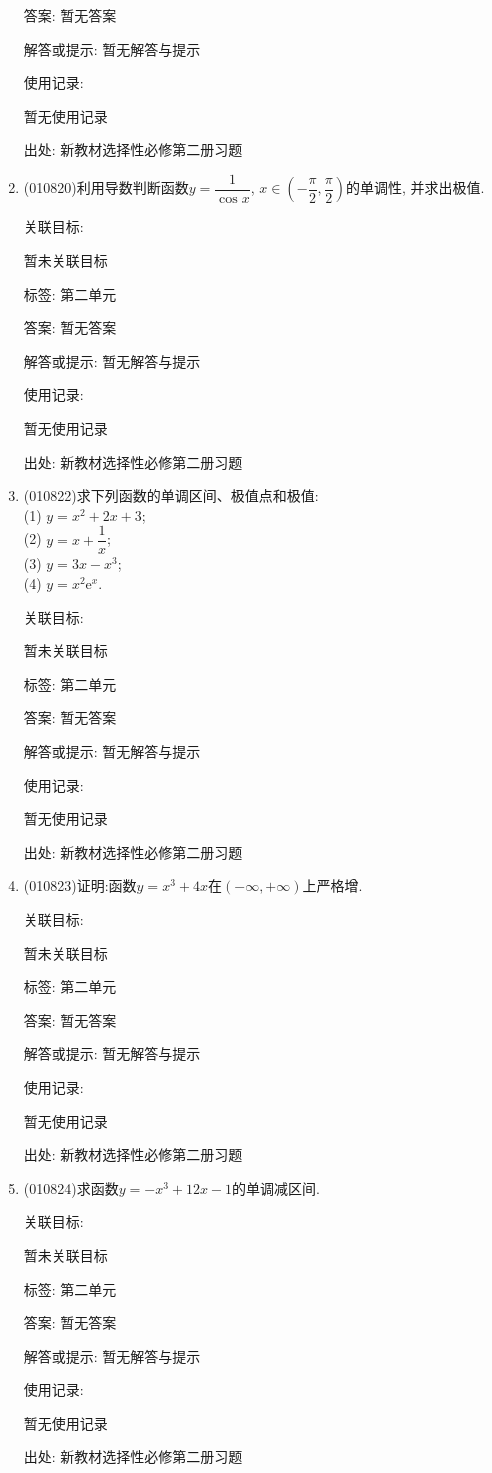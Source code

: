\documentclass[10pt,a4paper]{article}
\begin{document}
\begin{enumerate}[1.]
答案: 暂无答案

解答或提示: 暂无解答与提示

使用记录:

暂无使用记录


出处: 新教材选择性必修第二册习题
\item { (010820)}利用导数判断函数$y= \dfrac 1{\cos x}$, $x\in (-\dfrac\pi 2, \dfrac \pi 2)$的单调性, 并求出极值.


关联目标:

暂未关联目标



标签: 第二单元

答案: 暂无答案

解答或提示: 暂无解答与提示

使用记录:

暂无使用记录


出处: 新教材选择性必修第二册习题
\item { (010822)}求下列函数的单调区间、极值点和极值:\\
(1) $y=x^2+2x+3$;\\
(2) $y=x+\dfrac 1x$;\\
(3) $y=3x-x^3$;\\
(4) $y=x^2\mathrm{e}^x$.


关联目标:

暂未关联目标



标签: 第二单元

答案: 暂无答案

解答或提示: 暂无解答与提示

使用记录:

暂无使用记录


出处: 新教材选择性必修第二册习题
\item { (010823)}证明:函数$y=x^3+4x$在$(-\infty, +\infty)$上严格增.


关联目标:

暂未关联目标



标签: 第二单元

答案: 暂无答案

解答或提示: 暂无解答与提示

使用记录:

暂无使用记录


出处: 新教材选择性必修第二册习题
\item { (010824)}求函数$y=-x^3+12x-1$的单调减区间.


关联目标:

暂未关联目标



标签: 第二单元

答案: 暂无答案

解答或提示: 暂无解答与提示

使用记录:

暂无使用记录


出处: 新教材选择性必修第二册习题
\end{enumerate}
\end{document}
